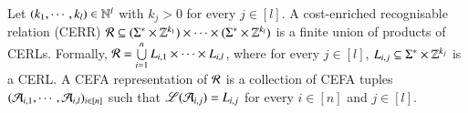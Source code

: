 

\begin{definition}
	Let $(k_1,\cdots, k_l) \in \mathbb{N}^l$ with $k_j > 0$ for every $j \in [l]$. A cost-enriched recognisable relation (CERR)  $\mathcal{R} \subseteq (\Sigma^* \times \mathbb{Z}^{k_1}) \times \cdots  \times (\Sigma^* \times \mathbb{Z}^{k_l})$ is a finite union of products of CERLs. Formally,
	$\mathcal{R} = \bigcup \limits_{i=1}^n L_{i,1 } \times \cdots \times L_{i, l}$, 
	where for every $j \in [l]$, $L_{i,j} \subseteq \Sigma^* \times \mathbb{Z}^{k_j}$ is a CERL. 
	A CEFA representation of $\mathcal{R}$ is a collection of CEFA tuples $(\mathcal{A}_{i,1}, \cdots, \mathcal{A}_{i,l})_{i \in [n]}$ such that $\mathscr{L}(\mathcal{A}_{i,j}) = L_{i,j}$ for every $i \in [n]$ and $j \in [l]$.
\end{definition}

